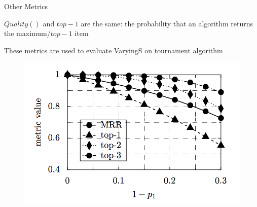 \documentclass{beamer}
\begin{document}
\begin{frame}{Other Metrics}
		\begin{block}{}
		$Quality()$ and $top-1$ are the same: the probability that an algorithm returns the maximum/$top-1$ item
		\end{block}
		
		\begin{block}{}
		These metrics are used to evaluate VaryingS on tournament algorithm
		\end{block}
		
		\begin{figure}
		\center
		\includegraphics[scale=0.4]{images/metrics.png}
		\end{figure}
		
		
\end{frame}
\end{document}
